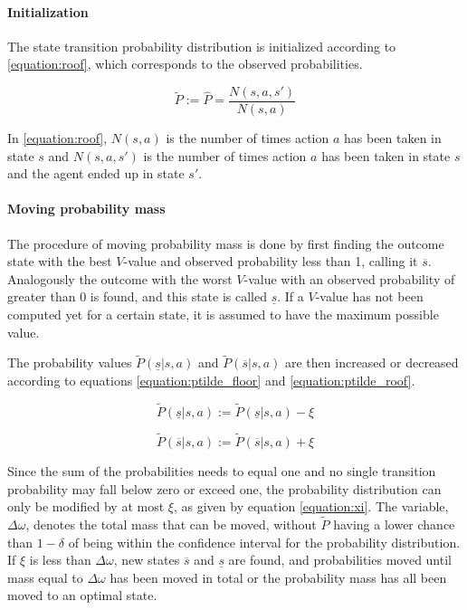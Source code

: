 \paragraph{Initialization} The state transition probability distribution is initialized according to
\eqref{equation:roof}, which corresponds to the observed probabilities.

\begin{equation}
\label{equation:roof}
\tilde{P} := \hat{P} = \frac{N(s,a,s')}{N(s,a)}
\end{equation}

In \eqref{equation:roof}, $N(s, a)$ is the number of times action $a$ has been taken in
state $s$ and $N(s, a, s')$ is the number of times action $a$ has been taken in
state $s$ and the agent ended up in state $s'$.

\paragraph{Moving probability mass} The procedure of moving probability mass is done by first finding the outcome
state with the best $V$-value and observed probability less than 1, calling it
$\overline{s}$. Analogously the outcome with the worst $V$-value with an
observed probability of greater than 0 is found, and this state is called
$\underline{s}$. If a $V$-value has not been computed yet for a certain state, it is 
assumed to have the maximum possible value. 

The probability values $\tilde{P}(\underline{s}|s,a)$ and
$\tilde{P}(\overline{s}|s,a)$ are then increased or decreased according to
equations \eqref{equation:ptilde_floor} and \eqref{equation:ptilde_roof}.

\begin{equation}
\label{equation:ptilde_floor}
\tilde{P}(\underline{s}|s,a) := \tilde{P}(\underline{s}|s,a)-\xi
\end{equation}

\begin{equation}
\label{equation:ptilde_roof}
\tilde{P}(\overline{s}|s,a) := \tilde{P}(\overline{s}|s,a)+\xi
\end{equation}

Since the sum of the probabilities needs to equal one and 
no single transition probability may fall below zero or exceed one, the probability distribution can only be modified by at most $\xi$, as given by
equation \eqref{equation:xi}. The variable, $\Delta\omega$, denotes the total mass that can be moved, without $\tilde{P}$ having a lower chance than $1 - \delta$ of being within the confidence interval for the probability distribution. If $\xi$ is less than $\Delta \omega$, new states
$\overline{s}$ and $\underline{s}$ are found, and probabilities moved until
mass equal to $\Delta \omega$ has been moved in total or the probability mass has all been moved to an optimal state. 

